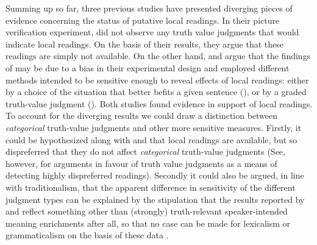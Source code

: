 \documentclass[fleqn,reqno,10pt,draft]{article}
\begin{document}
Summing up so far, three previous studies have presented diverging
pieces of evidence concerning the status of putative local
readings. In their picture verification experiment, \citet{GeurtsPouscoulous2009:Embedded-Implic} did not observe any truth value judgments that would indicate
local readings. On the basis of their results, they argue that these readings are simply not available. On the other
hand,  \citeauthor{CliftonDube2010:Embedded-Implic} and \citeauthor{ChemlaSpector2010:Experimental-Ev} argue that the findings of  \citeauthor{GeurtsPouscoulous2009:Embedded-Implic} may be due to a bias in their experimental design and
employed different methods intended to be sensitive enough to reveal effects of local readings: either by
a choice of the situation that better befits a given sentence (\citeauthor{CliftonDube2010:Embedded-Implic}), or by a graded
truth-value judgment (\citeauthor{ChemlaSpector2010:Experimental-Ev}). Both studies found evidence in support of local readings.
To account for the diverging results we could draw a distinction between \emph{categorical} truth-value
judgments and other more sensitive measures. Firstly, it could be hypothesized
along with \citeauthor{CliftonDube2010:Embedded-Implic} and
\citeauthor{ChemlaSpector2010:Experimental-Ev} that local readings are
available, but so dispreferred that they do not affect
\emph{categorical} truth-value judgments (See, however, \citet{Crain1998} for arguments in favour of truth value judgments
as a means of detecting highly dispreferred readings).
Secondly it could also be argued, in line with traditionalism, that the apparent difference in
sensitivity of the different judgment types can be explained by the stipulation that
the results reported by \citeauthor{CliftonDube2010:Embedded-Implic}
and \citeauthor{ChemlaSpector2010:Experimental-Ev} reflect something other than
(strongly) truth-relevant speaker-intended meaning enrichments after all, so that no case
can be made for lexicalism or grammaticalism on the basis of these data \citep[c.f.][for arguments along these lines]{Tielvan-Tiel2012:Embedded-Scalar}.
\end{document}
